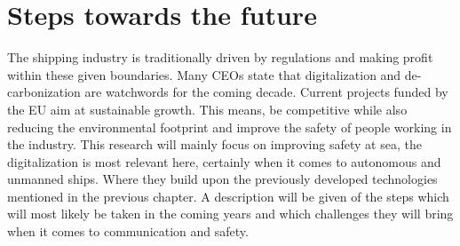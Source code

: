 \chapter{Steps towards the future}
\label{ch:future}
The shipping industry is traditionally driven by regulations and making profit within these given boundaries. Many CEOs state that digitalization and de-carbonization are watchwords for the coming decade.
Current projects funded by the EU aim at sustainable growth. This means, be competitive while also reducing the environmental footprint and improve the safety of people working in the industry. \cite{Eriksen2017} \cite{EU2017}
This research will mainly focus on improving safety at sea, the digitalization is most relevant here, certainly when it comes to autonomous and unmanned ships. Where they build upon the previously developed technologies mentioned in the previous chapter. A description will be given of the steps which will most likely be taken in the coming years and which challenges they will bring when it comes to communication and safety.


